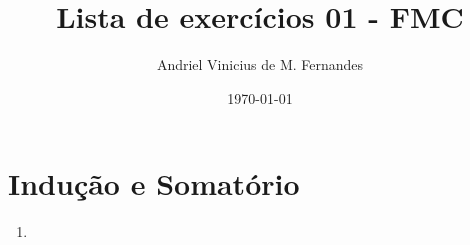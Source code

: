 \documentclass[12pt]{article}
\title{Lista de exercícios 01 - FMC}
\author{Andriel Vinicius de M. Fernandes}
\date{\today}
\begin{document}
	\maketitle
	\section{Indução e Somatório}
	\begin{enumerate}
		\item 
	\end{enumerate}
\end{document}
